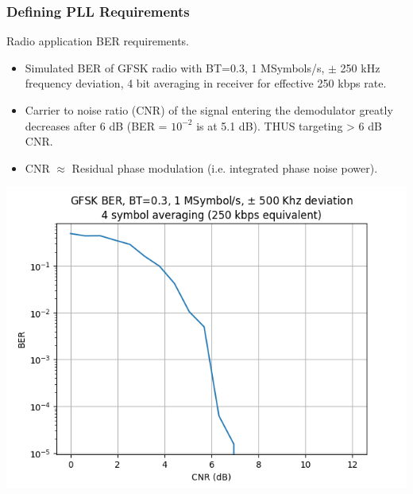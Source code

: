 \documentclass[t, screen, aspectratio=43]{beamer}
\begin{document}
\begin{frame}
	\frametitle{Defining PLL Requirements}
	\begin{block}{Radio application BER requirements.}
	\begin{minipage}{5cm}
		\begin{itemize}
			\scriptsize
			\item Simulated BER of GFSK radio with BT=0.3, 1 MSymbols/s, $\pm$ 250 kHz frequency deviation, 4 bit averaging in receiver for effective 250 kbps rate.
			\item Carrier to noise ratio (CNR) of the signal entering the demodulator greatly decreases after 6 dB (BER = $10^{-2}$ is at 5.1 dB). THUS targeting > 6 dB CNR.
			\item CNR $\approx$ Residual phase modulation (i.e. integrated phase noise power).
		\end{itemize} 	
	\end{minipage}
	\begin{minipage}{6cm}
		\vspace{1em}
		\hspace{1em}\includegraphics[width=1\textwidth, angle=0]{ber_curve.png}
	\end{minipage}
	\end{block}
\end{frame}
\end{document}
